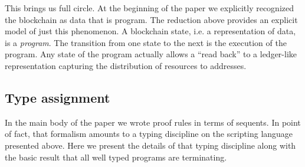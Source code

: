 \documentclass[]{acm_proc_article-sp}
\numberwithin{equation}{subsection}
\begin{document}
This brings us full circle. At the beginning of the paper we
explicitly recognized the blockchain as data that is program. The
reduction above provides an explicit model of just this phenomenon. A
blockchain state, i.e. a representation of data, is a
\emph{program}. The transition from one state to the next is the
execution of the program. Any state of the program actually allows a
``read back'' to a ledger-like representation capturing the
distribution of resources to addresses.

\subsection{Type assignment}

In the main body of the paper we wrote proof rules in terms of
sequents. In point of fact, that formalism amounts to a typing
discipline on the scripting language presented above. Here we present
the details of that typing discipline along with the basic result that
all well typed programs are terminating.

\begin{mathpar}
\end{mathpar}

\begin{mathpar}
\end{mathpar}

\begin{mathpar}
\end{mathpar}

\begin{mathpar}
\end{mathpar}

\begin{mathpar}
\end{mathpar}

\end{document}
